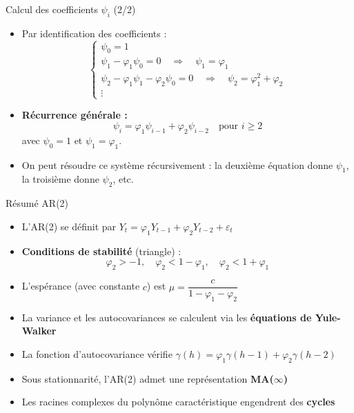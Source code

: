 \documentclass[11pt,aspectratio=169]{beamer}
\begin{document}
\begin{frame}{Calcul des coefficients $\psi_i$ (2/2)}

\begin{itemize}

\item Par identification des coefficients :
\[
\begin{cases}
\psi_0 = 1 \\
\psi_1 - \varphi_1 \psi_0 = 0 \quad \Rightarrow \quad \psi_1 = \varphi_1 \\
\psi_2 - \varphi_1 \psi_1 - \varphi_2 \psi_0 = 0 \quad \Rightarrow \quad \psi_2 = \varphi_1^2 + \varphi_2 \\
\vdots
\end{cases}
\]

\item \textbf{Récurrence générale :}
\[
\boxed{\psi_i = \varphi_1 \psi_{i-1} + \varphi_2 \psi_{i-2} \quad \text{pour } i \geq 2}
\]
avec $\psi_0 = 1$ et $\psi_1 = \varphi_1$.\newline

\item On peut résoudre ce système récursivement : la deuxième équation donne $\psi_1$, la troisième donne $\psi_2$, etc.

\end{itemize}
\end{frame}

\begin{frame}{Résumé AR(2)}
\begin{itemize}
\item L'AR(2) se définit par $Y_t = \varphi_1 Y_{t-1} + \varphi_2 Y_{t-2} + \varepsilon_t$
\item \textbf{Conditions de stabilité} (triangle) :
\[
\varphi_2 > -1, \quad \varphi_2 < 1 - \varphi_1, \quad \varphi_2 < 1 + \varphi_1
\]
\item L'espérance (avec constante $c$) est $\mu = \dfrac{c}{1 - \varphi_1 - \varphi_2}$
\item La variance et les autocovariances se calculent via les \textbf{équations de Yule-Walker}
\item La fonction d'autocovariance vérifie $\gamma(h) = \varphi_1 \gamma(h-1) + \varphi_2 \gamma(h-2)$
\item Sous stationnarité, l'AR(2) admet une représentation \textbf{MA($\infty$)}
\item Les racines complexes du polynôme caractéristique engendrent des \textbf{cycles}
\end{itemize}
\end{frame}
\end{document}
